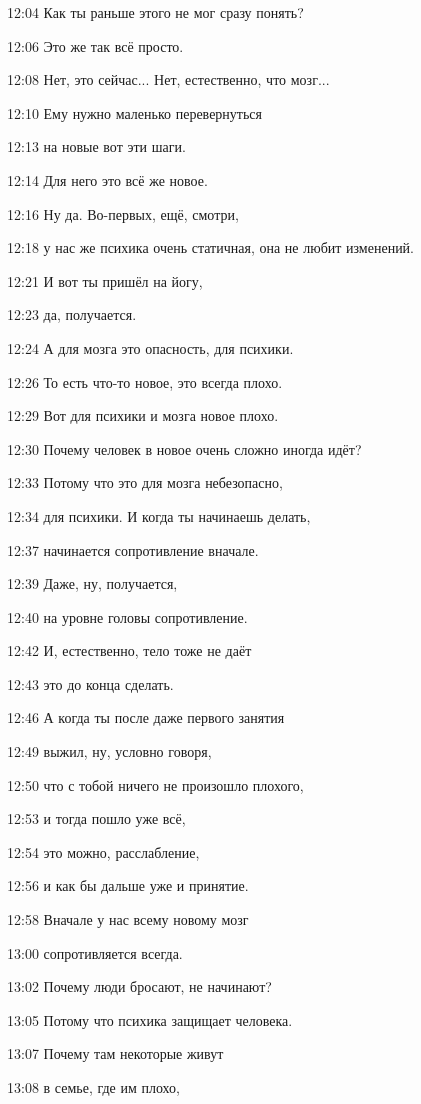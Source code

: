 12:04
Как ты раньше этого не мог сразу понять?

12:06
Это же так всё просто.

12:08
Нет, это сейчас... Нет, естественно, что мозг...

12:10
Ему нужно маленько перевернуться

12:13
на новые вот эти шаги.

12:14
Для него это всё же новое.

12:16
Ну да. Во-первых, ещё, смотри,

12:18
у нас же психика очень статичная, она не любит изменений.

12:21
И вот ты пришёл на йогу,

12:23
да, получается.

12:24
А для мозга это опасность, для психики.

12:26
То есть что-то новое, это всегда плохо.

12:29
Вот для психики и мозга новое плохо.

12:30
Почему человек в новое очень сложно иногда идёт?

12:33
Потому что это для мозга небезопасно,

12:34
для психики. И когда ты начинаешь делать,

12:37
начинается сопротивление вначале.

12:39
Даже, ну, получается,

12:40
на уровне головы сопротивление.

12:42
И, естественно, тело тоже не даёт

12:43
это до конца сделать.

12:46
А когда ты после даже первого занятия

12:49
выжил, ну, условно говоря,

12:50
что с тобой ничего не произошло плохого,

12:53
и тогда пошло уже всё,

12:54
это можно, расслабление,

12:56
и как бы дальше уже и принятие.

12:58
Вначале у нас всему новому мозг

13:00
сопротивляется всегда.

13:02
Почему люди бросают, не начинают?

13:05
Потому что психика защищает человека.

13:07
Почему там некоторые живут

13:08
в семье, где им плохо,


